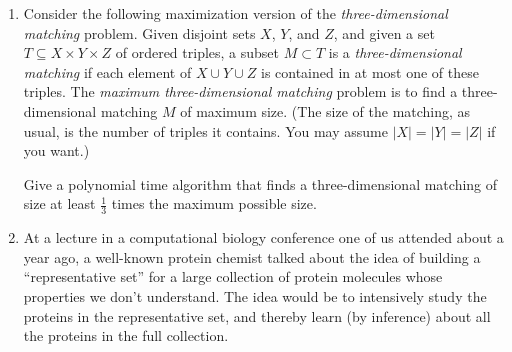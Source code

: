\documentclass[12pt]{article}
\begin{document}
\begin{enumerate}
{\begin{proof}
Therefore the optimal solution is not worse that this particular one.
That is,
$$w_{LP} \le  \sum_{i=1}^n w_i x_i =  \sum_{a_i\in S} w_i = w(S^*)$$
\end{proof}

Therefore we have a hitting set $S$, such that $w(S) \le b\cdot w(S^*)$.

}


\item

Consider the following maximization version of the
{\em three-dimensional matching} problem. Given disjoint sets $X$, $Y$, and
$Z$, and given a set $T \subseteq X \times Y \times Z$
of ordered triples, a subset $M \subset T$ is a {\em three-dimensional
matching} if each element of $X \cup Y \cup Z$ is contained in
at most one of these triples. The {\em maximum three-dimensional matching}
problem is to find a three-dimensional matching $M$ of maximum size.
(The size of the matching, as usual, is the number of triples
it contains.  You may assume $|X| = |Y| = |Z|$ if you want.)

Give a polynomial time algorithm that finds a three-dimensional matching
of size at least $\frac{1}{3}$ times the maximum possible size.



\item

At a lecture in a computational biology conference
one of us attended about a year ago, a well-known protein chemist
talked about the idea of building a ``representative set'' for
a large collection of protein molecules whose properties we
don't understand.
The idea would be to intensively study the proteins in
the representative set, and thereby learn (by inference) about all the proteins
in the full collection.


\end{enumerate}
\end{document}
